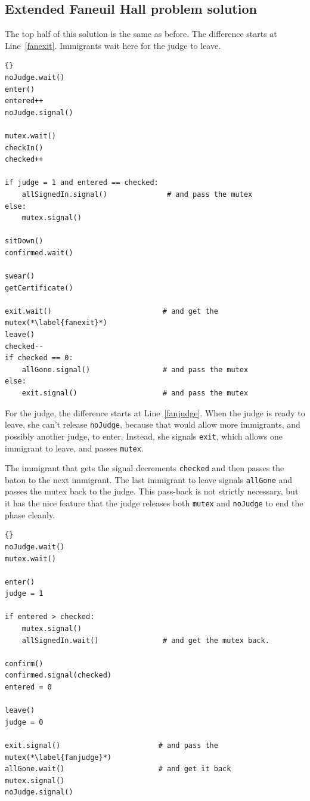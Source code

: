 \documentclass{book}
\begin{document}
\subsection {Extended Faneuil Hall problem solution}

The top half of this solution is the same as before.  The
difference starts at Line~\ref{fanexit}.  Immigrants wait
here for the judge to leave.

\begin{latin}
\begin{lstlisting}[title={Faneuil Hall problem solution (immigrant)}]{}
noJudge.wait()
enter()
entered++
noJudge.signal()

mutex.wait()
checkIn()
checked++

if judge = 1 and entered == checked:
    allSignedIn.signal()              # and pass the mutex
else:
    mutex.signal()

sitDown()
confirmed.wait()

swear()
getCertificate()

exit.wait()                          # and get the mutex(*\label{fanexit}*)
leave()
checked--
if checked == 0:
    allGone.signal()                 # and pass the mutex
else:
    exit.signal()                    # and pass the mutex
\end{lstlisting}
\end{latin}

For the judge, the difference starts at Line~\ref{fanjudge}.
When the judge is ready to leave, she can't release {\tt noJudge},
because that would allow more immigrants, and possibly another
judge, to enter.  Instead, she signals {\tt exit}, which allows
one immigrant to leave, and passes {\tt mutex}.

The immigrant that gets the signal decrements {\tt checked} and
then passes the baton to the next immigrant.  The last immigrant
to leave signals {\tt allGone} and passes the mutex back to the
judge.  This pass-back is not strictly necessary, but it has
the nice feature that the judge releases both {\tt mutex}
and {\tt noJudge} to end the phase cleanly.

\newpage
\begin{latin}
\begin{lstlisting}[title={Faneuil Hall problem solution (judge)}]{}
noJudge.wait()
mutex.wait()

enter()
judge = 1

if entered > checked:
    mutex.signal()
    allSignedIn.wait()               # and get the mutex back.

confirm()
confirmed.signal(checked)
entered = 0

leave()
judge = 0

exit.signal()                       # and pass the mutex(*\label{fanjudge}*)
allGone.wait()                      # and get it back
mutex.signal()
noJudge.signal()
\end{lstlisting}
\end{latin}
\end{document}
